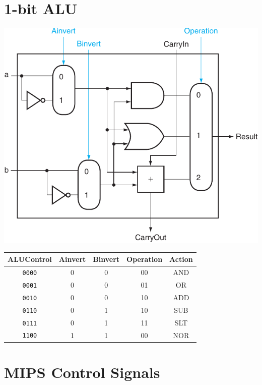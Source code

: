 \documentclass[11pt]{article}
\begin{document}
\begin{minipage}[t]{0.35\linewidth}
    \section*{1-bit ALU}
    \includegraphics[width=\linewidth]{content/alu.pdf}
    \begin{center}
        \begin{tabular}[t]{c|ccc|c}
            \toprule
            ALUControl & Ainvert & Binvert & Operation & Action \\
            \midrule
            {\tt 0000} & 0       & 0       & 00        & AND    \\
            {\tt 0001} & 0       & 0       & 01        & OR     \\
            {\tt 0010} & 0       & 0       & 10        & ADD    \\
            {\tt 0110} & 0       & 1       & 10        & SUB    \\
            {\tt 0111} & 0       & 1       & 11        & SLT    \\
            {\tt 1100} & 1       & 1       & 00        & NOR    \\
            \bottomrule
        \end{tabular}
    \end{center}
\end{minipage}

\vfill

\begin{minipage}[t]{\linewidth}
    \section*{MIPS Control Signals}

    \begin{minipage}[t]{0.32\textwidth}
        
    \end{minipage}
    \begin{minipage}[t]{0.64\textwidth}
        
    \end{minipage}
\end{minipage}
\end{document}
